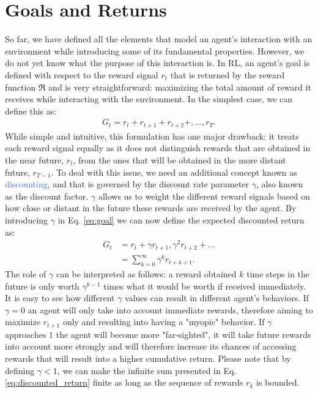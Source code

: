 \section{Goals and Returns}
\label{sec:goals_and_returns}
So far, we have defined all the elements that model an agent's interaction with an environment while introducing some of its fundamental properties. However, we do not yet know what the purpose of this interaction is. In RL, an agent's goal is defined with respect to the reward signal $r_t$ that is returned by the reward function $\Re$ and is very straightforward: maximizing the total amount of reward it receives while interacting with the environment. In the simplest case, we can define this as:
\begin{align}
	G_t = r_t + r_{t+1} + r_{t+2} +, \ldots, r_{T}.
\label{eq:goal}
\end{align}
While simple and intuitive, this formulation has one major drawback: it treats each reward signal equally as it does not distinguish rewards that are obtained in the near future, $r_t$, from the ones that will be obtained in the more distant future, $r_{T-1}$. To deal with this issue, we need an additional concept known as \textcolor{RoyalBlue}{discounting}, and that is governed by the discount rate parameter $\gamma$, also known as the discount factor. $\gamma$ allows us to weight the different reward signals based on how close or distant in the future these rewards are received by the agent. By introducing $\gamma$ in Eq. \ref{eq:goal} we can now define the expected discounted return as:
\begin{equation}
	\begin{split}
	G_t & = r_t+\gamma r_{t+1}, \gamma^{2} r_{t+2} + ... \\
	    & = \sum_{k=0}^{\infty}\gamma^{k} r_{t+k+1}.
	\end{split}
\label{eq:discounted_return}
\end{equation}
The role of $\gamma$ can be interpreted as follows: a reward obtained $k$ time steps in the future is only worth $\gamma^{k-1}$ times what it would be worth if received immediately. It is easy to see how different $\gamma$ values can result in different agent's behaviors. If $\gamma=0$ an agent will only take into account immediate rewards, therefore aiming to maximize $r_{t+1}$ only and resulting into having a "myopic" behavior. If $\gamma$ approaches $1$ the agent will become more "far-sighted", it will take future rewards into account more strongly and will therefore increase its chances of accessing rewards that will result into a higher cumulative return. 
Please note that by defining $\gamma < 1$, we can make the infinite sum presented in Eq. \ref{eq:discounted_return} finite as long as the sequence of rewards $r_k$ is bounded.   

